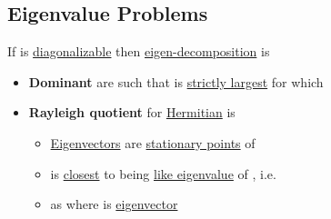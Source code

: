 \subsection*{Eigenvalue Problems}

If  is \underline{diagonalizable} then \underline{eigen-decomposition} is 

\begin{itemize}

      \item
            \textbf{Dominant}  are such that
             is \underline{strictly largest} for which
            \tcbbreak
      \item
            \textbf{Rayleigh quotient} for \underline{Hermitian}  is

            \begin{itemize}

                  \item
                        \underline{Eigenvectors} are \underline{stationary points} of 
                  \item
                         is \underline{closest} to being \underline{like eigenvalue}
                        of , i.e. 
                  \item
                        as  where \iMbox{\nu} is \underline{eigenvector}
            \end{itemize}
\end{itemize}

\hSep %


